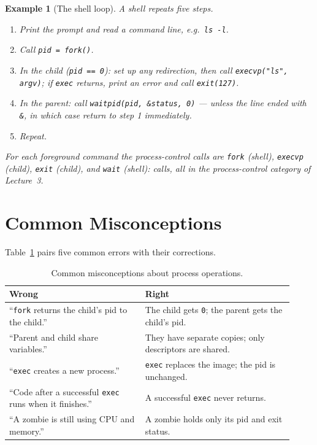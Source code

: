 \documentclass[11pt]{article}
\newtheorem{example}{Example}
\begin{document}
\begin{example}[The shell loop]
\label{ex:shell}
A shell repeats five steps.
\begin{enumerate}
  \item Print the prompt and read a command line, e.g.\ \texttt{ls -l}.
  \item Call \texttt{pid = fork()}.
  \item In the child (\texttt{pid == 0}): set up any redirection, then call
    \texttt{execvp("ls", argv)}; if \texttt{exec} returns, print an error and
    call \texttt{exit(127)}.
  \item In the parent: call \texttt{waitpid(pid, \&status, 0)} --- unless the
    line ended with \texttt{\&}, in which case return to step 1 immediately.
  \item Repeat.
\end{enumerate}
For each foreground command the process-control calls are \texttt{fork}
(shell), \texttt{execvp} (child), \texttt{exit} (child), and \texttt{wait}
(shell):  calls, all in the process-control category of Lecture~3.
\end{example}

\section{Common Misconceptions}

Table~\ref{tab:misc} pairs five common errors with their corrections.

\begin{table}[h]
\centering
\small
\renewcommand{\arraystretch}{1.3}
\begin{tabular}{@{}>{\raggedright\arraybackslash}p{0.44\linewidth}>{\raggedright\arraybackslash}p{0.48\linewidth}@{}}
\toprule
\textbf{Wrong} & \textbf{Right} \\
\midrule
``\texttt{fork} returns the child's pid to the child.'' & The child gets \texttt{0}; the parent gets the child's pid. \\
``Parent and child share variables.'' & They have separate copies; only descriptors are shared. \\
``\texttt{exec} creates a new process.'' & \texttt{exec} replaces the image; the pid is unchanged. \\
``Code after a successful \texttt{exec} runs when it finishes.'' & A successful \texttt{exec} never returns. \\
``A zombie is still using CPU and memory.'' & A zombie holds only its pid and exit status. \\
\bottomrule
\end{tabular}
\caption{Common misconceptions about process operations.}
\label{tab:misc}
\end{table}
\end{document}

